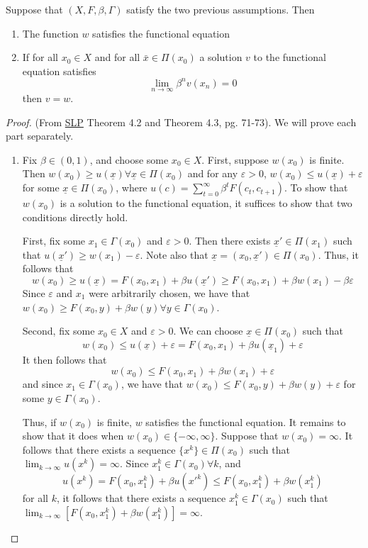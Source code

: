 \documentclass[10pt]{article}
\begin{document}
\begin{theorem}\label{thm:principle_optimal_one} 
	Suppose that $(X,F,\beta,\Gamma)$ satisfy the two previous assumptions. Then 
	\begin{enumerate}
		\item The function $w$ satisfies the functional equation
		\item If for all $x_0\in X$ and for all $\bar{x} \in \Pi(x_0)$ a solution $v$ to the functional equation satisfies
		\[
		\lim_{n\to\infty} \beta^n v(x_n) = 0
		\]
		then $v = w$.
	\end{enumerate}
\end{theorem}
\begin{proof}
	(From \href{https://www.hup.harvard.edu/books/9780674750968}{SLP} Theorem 4.2 and Theorem 4.3, pg. 71-73). We will prove each part separately.
	\begin{enumerate}
		\item Fix $\beta \in (0,1)$, and choose some $x_0 \in X$. First, suppose $w(x_0)$ is finite. Then $w(x_0) \ge u(\underline{x}) \forall \underline{x} \in \Pi(x_0)$ and for any $\varepsilon > 0$, $w(x_0) \le u(\underline{x}) + \varepsilon$ for some $\underline{x} \in \Pi(x_0)$, where $u(c) = \sum_{t=0}^\infty \beta^t F(c_t,c_{t+1})$. To show that $w(x_0)$ is a solution to the functional equation, it suffices to show that two conditions directly hold. 
		
		First, fix some $x_1 \in \Gamma(x_0)$ and $\varepsilon > 0$. Then there exists $\underline{x}' \in \Pi(x_1)$ such that $u(\underline{x}') \ge w(x_1) - \varepsilon$. Note also that $\underline{x} = (x_0,\underline{x}') \in \Pi(x_0)$. Thus, it follows that
		\[
		w(x_0) \ge u(\underline{x}) = F(x_0,x_1) + \beta u(\underline{x}') \ge F(x_0,x_1) + \beta w(x_1) - \beta \varepsilon
		\]
		Since $\varepsilon$ and $x_1$ were arbitrarily chosen, we have that $w(x_0) \ge F(x_0,y) + \beta w(y) \forall y \in \Gamma(x_0)$.
		
		Second, fix some $x_0 \in X$ and $\varepsilon > 0$. We can choose $\underline{x} \in \Pi(x_0)$ such that 
		\[
		w(x_0) \le u(\underline{x}) + \varepsilon = F(x_0,x_1) + \beta u(\underline{x}_1) + \varepsilon
		\]
		It then follows that 
		\[
		w(x_0) \le F(x_0,x_1) + \beta w(x_1) + \varepsilon
		\]
		and since $x_1 \in \Gamma(x_0)$, we have that $w(x_0) \le F(x_0,y) + \beta w(y) + \varepsilon$ for some $y \in \Gamma(x_0)$. 
		
		Thus, if $w(x_0)$ is finite, $w$ satisfies the functional equation. It remains to show that it does when $w(x_0) \in \{-\infty,\infty\}$. Suppose that $w(x_0) = \infty$. It follows that there exists a sequence $\{x^k\} \in \Pi(x_0)$ such that $\lim_{k\to\infty} u(x^k) = \infty$. Since $x_1^k \in \Gamma(x_0) \forall k$, and
		\[
		u(x^k) = F(x_0,x_1^k) + \beta u(x'^k) \le F(x_0,x_1^k) + \beta w(x_1^k)
		\] 
		for all $k$, it follows that there exists a sequence $x_1^k \in \Gamma(x_0)$ such that $\lim_{k\to\infty} [F(x_0,x_1^k) + \beta w(x_1^k)] = \infty$.
		

\end{enumerate}
\end{proof}
\end{document}
